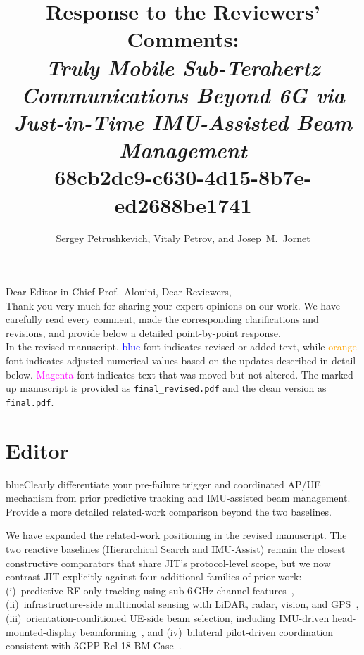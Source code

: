 \documentclass{article}
\title{\vspace{-2.5cm}\textbf{Response to the Reviewers' Comments: \\ \emph{\Large Truly Mobile Sub-Terahertz Communications Beyond 6G via Just-in-Time IMU-Assisted Beam Management}}\\\Large 68cb2dc9-c630-4d15-8b7e-ed2688be1741}
\author{Sergey Petrushkevich, Vitaly Petrov, and Josep~M.~Jornet\\}
\date{}
\newcommand{\blue}[1]{\begin{color}{blue}#1\end{color}}
\begin{document}
\maketitle

\noindent Dear Editor-in-Chief Prof.\ Alouini, Dear Reviewers,\\

\noindent Thank you very much for sharing your expert opinions on our work. We have carefully read every comment, made the corresponding clarifications and revisions, and provide below a detailed point-by-point response.\\

\noindent In the revised manuscript, \textcolor{blue}{blue} font indicates revised or added text, while \textcolor{orange}{orange} font indicates adjusted numerical values based on the updates described in detail below. \textcolor{magenta}{Magenta} font indicates text that was moved but not altered. The marked-up manuscript is provided as \texttt{final\_revised.pdf} and the clean version as \texttt{final.pdf}.\\

\newpage

\section*{Editor}

\begin{tcbremark}
{\selectfont
\blue{Clearly differentiate your pre-failure trigger and coordinated AP/UE mechanism from prior predictive tracking and IMU-assisted beam management. Provide a more detailed related-work comparison beyond the two baselines.}
}
\end{tcbremark}

\noindent We have expanded the related-work positioning in the revised manuscript. The two reactive baselines (Hierarchical Search and IMU-Assist) remain the closest constructive comparators that share JIT's protocol-level scope, but we now contrast JIT explicitly against four additional families of prior work: (i)~predictive RF-only tracking using sub-6\,GHz channel features~\cite{Alrabeiah2020DeepLearning}, (ii)~infrastructure-side multimodal sensing with LiDAR, radar, vision, and GPS~\cite{Alkhateeb2023DeepSense, Jiang2023LiDAR, Morais2023Position}, (iii)~orientation-conditioned UE-side beam selection, including IMU-driven head-mounted-display beamforming~\cite{Rezaie2022Orientation, Struye2023CoVRage}, and (iv)~bilateral pilot-driven coordination consistent with 3GPP Rel-18 BM-Case~\cite{Alkhateeb2018DLCB, Xue2023Standardization, Heng2021SixChallenges}.\\
\end{document}
